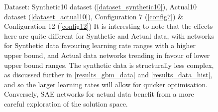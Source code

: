 \documentclass[a4paper,11pt,oneside]{article}
\theoremstyle{plain}
\theoremstyle{definition}
\begin{document}
\begin{figure}[H]
\begin{subfigure}{.5\textwidth}
			\label{figure-actual_mse_minmax_lr}
		\end{subfigure}
		\caption[SAE MSE by Learning Rates]{Dataset: Synthetic10 dataset (\ref{dataset_synthetic10}), Actual10 dataset (\ref{dataset_actual10}), Configuration 7 (\ref{config7}) \& Configuration 12 (\ref{config12})
			\newline It is interesting to  note that the effects here are quite different for Synthetic and Actual data, with networks for Synthetic data favouring learning rate ranges with a higher upper bound, and Actual data networks trending in favour of lower upper bound ranges. The synthetic data is structurally less complex, as discussed further in \ref{results_gbm_data} and \ref{results_data_hist}, and so the larger learning rates will allow for quicker optimisation. Conversely, SAE networks for actual data benefit from a more careful exploration of the solution space.}
		\label{figure-mse_lr}
	\end{figure}
	
\end{document}

